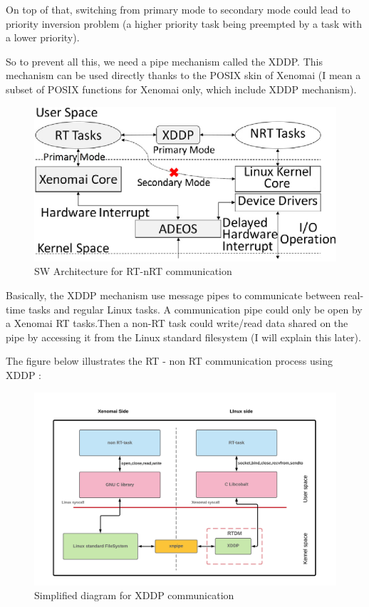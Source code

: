 \documentclass[12pt,hidelinks]{article}
\begin{document}
{    On top of that, switching from primary mode to secondary mode could lead to priority inversion problem (a higher priority task being preempted by a task with a lower priority).
    
    So to prevent all this, we need a pipe mechanism called the XDDP. This mechanism can be used directly thanks to the POSIX skin of Xenomai (I mean a subset of POSIX functions for Xenomai only, which include XDDP mechanism).
    
    \begin{figure}[ht]
    \centering
	\includegraphics[scale=0.7]{SW.png}
	\caption{SW Architecture for RT-nRT  communication}
	\end{figure} \newline
    
    Basically, the XDDP mechanism use message pipes to communicate between real-time tasks and regular Linux tasks. A communication pipe could only be open by a Xenomai RT tasks.Then a non-RT task could write/read data shared on the pipe by accessing it from the Linux standard filesystem (I will explain this later).
    
    The figure below illustrates the RT - non RT communication process using XDDP :
    \begin{figure}[ht]
	\includegraphics[scale=0.25]{XDDPcom.png}
	\caption{Simplified diagram for XDDP communication}
	\end{figure} \newline
	
}
\end{document}
